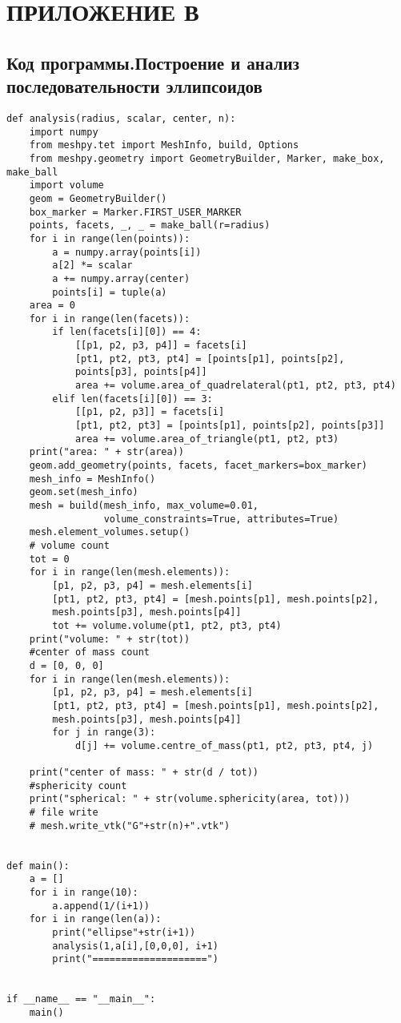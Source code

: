 \chapter*{ПРИЛОЖЕНИЕ В}
\section*{\centering Код программы.Построение и анализ последовательности эллипсоидов}
\begin{footnotesize}
\begin{lstlisting}
def analysis(radius, scalar, center, n):
    import numpy
    from meshpy.tet import MeshInfo, build, Options
    from meshpy.geometry import GeometryBuilder, Marker, make_box, make_ball
    import volume
    geom = GeometryBuilder()
    box_marker = Marker.FIRST_USER_MARKER
    points, facets, _, _ = make_ball(r=radius)
    for i in range(len(points)):
        a = numpy.array(points[i])
        a[2] *= scalar
        a += numpy.array(center)
        points[i] = tuple(a)
    area = 0
    for i in range(len(facets)):
        if len(facets[i][0]) == 4:
            [[p1, p2, p3, p4]] = facets[i]
            [pt1, pt2, pt3, pt4] = [points[p1], points[p2],
            points[p3], points[p4]]
            area += volume.area_of_quadrelateral(pt1, pt2, pt3, pt4)
        elif len(facets[i][0]) == 3:
            [[p1, p2, p3]] = facets[i]
            [pt1, pt2, pt3] = [points[p1], points[p2], points[p3]]
            area += volume.area_of_triangle(pt1, pt2, pt3)
    print("area: " + str(area))
    geom.add_geometry(points, facets, facet_markers=box_marker)
    mesh_info = MeshInfo()
    geom.set(mesh_info)
    mesh = build(mesh_info, max_volume=0.01,
                 volume_constraints=True, attributes=True)
    mesh.element_volumes.setup()
    # volume count
    tot = 0
    for i in range(len(mesh.elements)):
        [p1, p2, p3, p4] = mesh.elements[i]
        [pt1, pt2, pt3, pt4] = [mesh.points[p1], mesh.points[p2],
        mesh.points[p3], mesh.points[p4]]
        tot += volume.volume(pt1, pt2, pt3, pt4)
    print("volume: " + str(tot))
    #center of mass count
    d = [0, 0, 0]
    for i in range(len(mesh.elements)):
        [p1, p2, p3, p4] = mesh.elements[i]
        [pt1, pt2, pt3, pt4] = [mesh.points[p1], mesh.points[p2],
        mesh.points[p3], mesh.points[p4]]
        for j in range(3):
            d[j] += volume.centre_of_mass(pt1, pt2, pt3, pt4, j)

    print("center of mass: " + str(d / tot))
    #sphericity count
    print("spherical: " + str(volume.sphericity(area, tot)))
    # file write
    # mesh.write_vtk("G"+str(n)+".vtk")


def main():
    a = []
    for i in range(10):
        a.append(1/(i+1))
    for i in range(len(a)):
        print("ellipse"+str(i+1))
        analysis(1,a[i],[0,0,0], i+1)
        print("====================")
        

if __name__ == "__main__":
    main()

\end{lstlisting}
\end{footnotesize}

